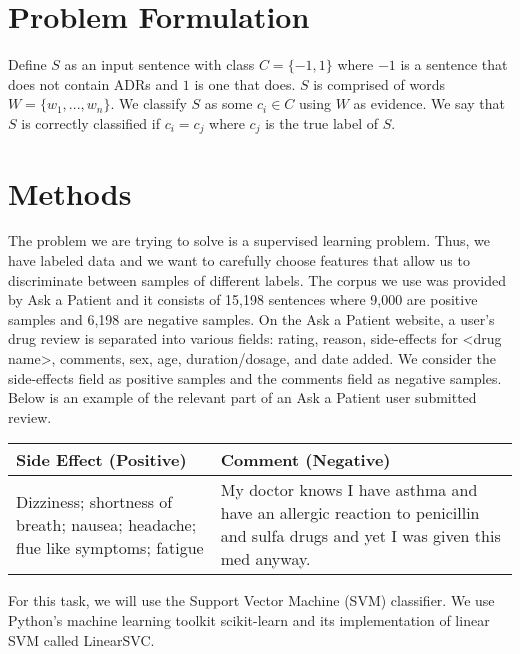 \documentclass{acm_proc_article-sp}
\begin{document}
\section{Problem Formulation}
Define $S$ as an input sentence with class $C = \{-1,1\}$ where $-1$ is a sentence that does not contain ADRs and $1$ is one that does. $S$ is comprised of words $W = \{w_1,...,w_n\}$. We classify $S$ as some $c_i \in C$ using $W$ as evidence. We say that $S$ is correctly classified if $c_i=c_j$ where $c_j$ is the true label of $S$. 


\section{Methods}
The problem we are trying to solve is a supervised learning problem. Thus, we have labeled data and we want to carefully choose features that allow us to discriminate between samples of different labels. The corpus we use was provided by Ask a Patient and it consists of 15,198 sentences where 9,000 are positive samples and 6,198 are negative samples. On the Ask a Patient website, a user's drug review is separated into various fields: rating, reason, side-effects for <drug name>, comments, sex, age, duration/dosage, and date added. We consider the side-effects field as positive samples and the comments field as negative samples. Below is an example of the relevant part of an Ask a Patient user submitted review.

\begin{tabular}{| p{4cm} | p{4cm} |}
\hline
Side Effect (Positive) & Comment (Negative) \\ \hline
Dizziness; shortness of breath; nausea; headache; flue like symptoms; fatigue & My doctor knows I have asthma and have an allergic reaction to penicillin and sulfa drugs and yet I was given this med anyway. \\ \hline
\end{tabular} 

For this task, we will use the Support Vector Machine (SVM) classifier. We use Python's machine learning toolkit scikit-learn and its implementation of linear SVM called LinearSVC.
\end{document}
